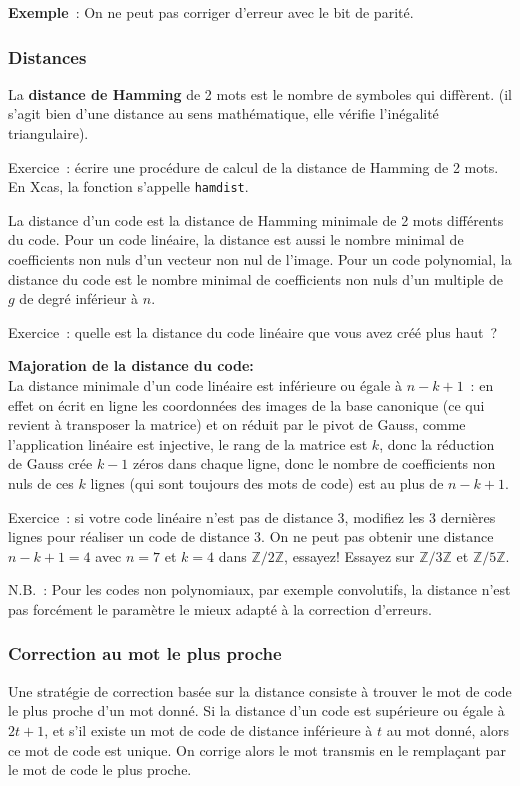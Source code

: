 \documentclass[a4paper,11pt]{article}
\begin{document}
\begin{giacjshere}
{\bf Exemple}~: On ne peut pas corriger d'erreur avec le bit de parité.

\subsubsection{Distances} 
La {\bf distance de Hamming} 
de 2 mots est le nombre de symboles qui diffèrent.
(il s'agit bien d'une distance au sens mathématique, 
elle v\'erifie l'in\'egalit\'e triangulaire). 

Exercice~: écrire une procédure de calcul de la distance de Hamming
de 2 mots. En Xcas, la fonction s'appelle {\tt hamdist}.

La distance d'un code est la distance de Hamming minimale
de 2 mots diff\'erents du code.
Pour un code lin\'eaire, la distance est aussi le nombre minimal
de coefficients non nuls d'un vecteur non nul de l'image.
Pour un code polynomial, la distance du code
est le nombre minimal de coefficients non nuls d'un multiple
de $g$ de degr\'e inf\'erieur \`a $n$.

Exercice~: quelle est la distance du code linéaire que
vous avez créé plus haut~?

{\bf Majoration de la distance du code:}\\
La distance minimale d'un code lin\'eaire est inf\'erieure ou 
\'egale \`a $n-k+1$~: en effet on écrit en ligne les coordonnées
des images de la base canonique (ce qui revient \`a transposer la
matrice) et on réduit par le pivot de Gauss,
comme l'application linéaire est injective, le rang de la matrice
est $k$, donc la réduction de Gauss crée $k-1$
zéros dans chaque ligne, donc le nombre de coefficients non nuls
de ces $k$ lignes (qui sont toujours des mots de code) est 
au plus de $n-k+1$.

Exercice~: si votre code linéaire n'est pas de distance 3, modifiez
les 3 dernières lignes pour réaliser un code de distance 3. On
ne peut pas obtenir une distance $n-k+1=4$ avec $n=7$ et $k=4$ 
dans $\mathbb{Z}/2\mathbb{Z}$, essayez! Essayez sur $\mathbb{Z}/3\mathbb{Z}$ et $\mathbb{Z}/5\mathbb{Z}$.

N.B.~: Pour les codes non
polynomiaux, par exemple convolutifs, la distance n'est pas
forc\'ement le
param\`etre le mieux adapt\'e \`a la correction d'erreurs.

\subsubsection{Correction au mot le plus proche}
Une strat\'egie de correction bas\'ee sur la distance consiste \`a
trouver le mot de code le plus proche d'un mot donn\'e.
Si la distance d'un code est sup\'erieure ou \'egale
\`a $2t+1$, et s'il existe un mot de code de distance inf\'erieure
\`a $t$ au mot donn\'e, alors ce mot de code est unique.
On corrige alors le mot transmis en le remplaçant par le mot de code
le plus proche.


\end{giacjshere}
\end{document}
